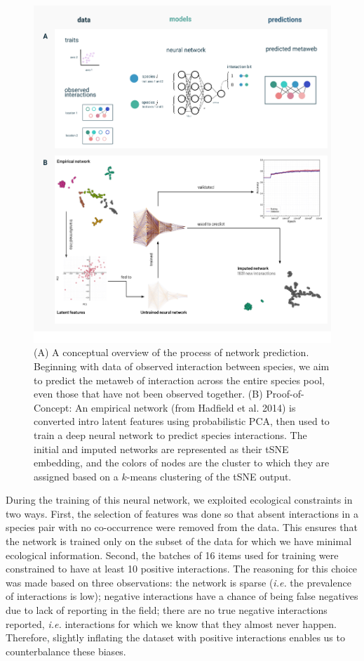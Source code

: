 \documentclass[11pt]{article}
\makeatletter
\def\maxwidth{\ifdim\Gin@nat@width>\linewidth\linewidth
\else\Gin@nat@width\fi}
\let\Oldincludegraphics\includegraphics
\renewcommand{\includegraphics}[1]{\Oldincludegraphics[width=\maxwidth]{#1}}
\makeatother
\begin{document}
\begin{figure}
\hypertarget{fig:example}{%
\centering
\includegraphics{figures/example_network_prediction.png}
\caption{(A) A conceptual overview of the process of network prediction.
Beginning with data of observed interaction between species, we aim to
predict the metaweb of interaction across the entire species pool, even
those that have not been observed together. (B) Proof-of-Concept: An
empirical network (from Hadfield et al. 2014) is converted intro latent
features using probabilistic PCA, then used to train a deep neural
network to predict species interactions. The initial and imputed
networks are represented as their tSNE embedding, and the colors of
nodes are the cluster to which they are assigned based on a \(k\)-means
clustering of the tSNE output.}\label{fig:example}
}
\end{figure}

During the training of this neural network, we exploited ecological
constraints in two ways. First, the selection of features was done so
that absent interactions in a species pair with no co-occurrence were
removed from the data. This ensures that the network is trained only on
the subset of the data for which we have minimal ecological information.
Second, the batches of 16 items used for training were constrained to
have at least 10 positive interactions. The reasoning for this choice
was made based on three observations: the network is sparse (\emph{i.e.}
the prevalence of interactions is low); negative interactions have a
chance of being false negatives due to lack of reporting in the field;
there are no true negative interactions reported, \emph{i.e.}
interactions for which we know that they almost never happen. Therefore,
slightly inflating the dataset with positive interactions enables us to
counterbalance these biases.
\end{document}
